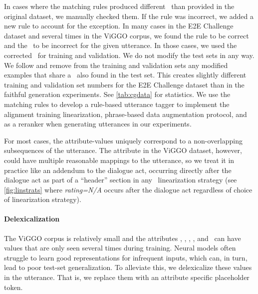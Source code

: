 

In cases where the matching rules produced different
\meaningrepresentations~than provided in the original dataset, we manually
checked them. If the rule was incorrect, we added a new rule to account for the
exception.  In many cases in the E2E Challenge dataset and several times in the
ViGGO corpus, we found the rule to be correct and the \meaningrepresentation~to
be incorrect for the given utterance. In those cases, we used the corrected
\meaningrepresentations~for training and validation.  We do not modify the test
sets in any way. We follow \citet{dusek2019} and remove from the training and
validation sets any modified examples that share a \meaningrepresentation~also
found in the test set. This creates slightly different training and validation
set numbers for the E2E Challenge dataset than in the faithful generation
experiments. See \autoref{tab:cgdata} for statistics.  We use the matching
rules to develop  a rule-based utterance tagger to implement the alignment
training linearization, phrase-based data augmentation protocol, and as a
reranker when generating utterances in our experiments.

For most cases, the attribute-values uniquely correspond to a non-overlapping
subsequences of the utterance. The  attribute in the ViGGO
dataset, however, could have multiple reasonable mappings to the utterance, so
we treat it in practice like an addendum to the dialogue act, occurring
directly after the dialogue act as part of a ``header'' section in any
\meaningrepresentation~linearization strategy (see \autoref{fig:linstrats}
where \textit{rating=N/A} occurs after the dialogue act regardless of choice of
linearization strategy).

\paragraph{Delexicalization} The ViGGO corpus is relatively small and the
attributes , , ,
, and ~can have values that are
only seen several times during training. Neural models often struggle to learn
good representations for infrequent inputs, which can, in turn, lead to poor
test-set generalization. To alleviate this, we delexicalize these values in the
utterance. That is, we replace them with an attribute specific placeholder
token.

